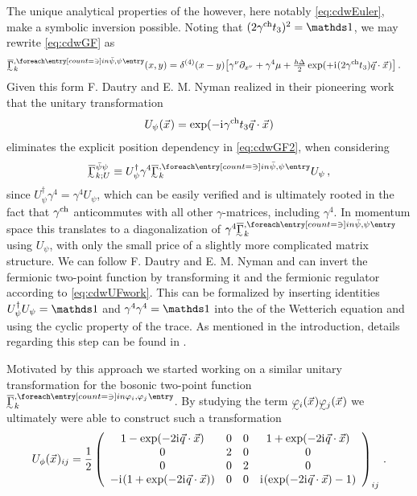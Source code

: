 The unique analytical properties of the \cdw{} however, here notably \cref{eq:cdwEuler}, make a symbolic inversion possible. Noting that $(2\gammach t_3)^2=\Id$, we may rewrite \cref{eq:cdwGF}
as
\begin{align}
\FSvertexArg{\FSeaaEoMI}{\MFpsib, \MFpsi}(x,y)&=\delta^{(4)}(x-y)\big[\gamma^\nu\partial_{x^\nu}+\gamma^4\mu +\tfrac{h \Delta}{2} \exp(+ \iu (2\gammach t_3) \vec{q}\cdot\vec{x}\vts) \big]\label{eq:cdwGF2}\, .
\end{align}
Given this form F. Dautry and E. M. Nyman realized in their pioneering work~\cite{Dautry:1979bk} that the unitary transformation
\begin{align}
U_\psi(\vec{x}\mskip1.0mu)= \exp(- \mathrm{i}\mkern1mu \gamma^{\mathrm{ch}} t_3 \vec{q}\cdot\vec{x}\mskip1.0mu)
\label{eq:cdwUf}
\end{align}
eliminates the explicit position dependency in \cref{eq:cdwGF2}, when considering
\begin{align}
\FSeaaEoMI_{k;U}^{\MFpsib\MFpsi}\equiv U_\psi^\dagger \gamma^4 \FSvertexArg{\FSeaaEoMI}{\MFpsib, \MFpsi} U_\psi\, ,\label{eq:cdwUFwork}
\end{align}
since $U_\psi^\dagger  \gamma^4 =  \gamma^4U_\psi$, which can be easily verified and is ultimately rooted in the fact that $\gamma^{\mathrm{ch}}$ anticommutes with all other $\gamma$-matrices, including $\gamma^4$. In momentum space this translates to a diagonalization of $\gamma^4 \FSvertexArg{\FSeaaEoMI}{\MFpsib, \MFpsi}$ using $U_\psi$, with only the small price of a slightly more complicated matrix structure. We can follow  F. Dautry and E. M. Nyman and can invert the fermionic two-point function by transforming it and the fermionic regulator according to \eqref{eq:cdwUFwork}.
This can be formalized by inserting identities $U_\psi^\dagger U_\psi=\Id$ and $\gamma^4\gamma^4=\Id$ into the \rhs{} of the Wetterich equation and using the cyclic property of the trace. As mentioned in the introduction, details regarding this step can be found in .

Motivated by this approach we started working on a similar unitary transformation for the bosonic two-point function $\FSvertexArg{\FSeaaEoMI}{\MFphi_i, \MFphi_j}$. 
By studying the term $\MFEIphi_i(\vec{x}\vts) \MFEIphi_j(\vec{x}\vts)$ we ultimately were able to construct such a transformation
\begin{align}
U_\phi(\vec{x}\mskip1.0mu)_{ij}=\frac{1}{2}\left(
\begin{array}{cccc}
	1 - \exp(-2\mathrm{i}\mkern1mu \vec q \cdot \vec x)& 0& 0& 1+\exp(-2\mathrm{i}\mkern1mu \vec q \cdot \vec x)\\
	0 & 2& 0&0\\
	0 & 0& 2&0\\
	-\mathrm{i}\mkern1mu(1+\exp(-2\mathrm{i}\mkern1mu \vec q \cdot \vec x)) & 0& 0& \mathrm{i}\mkern1mu(\exp(-2\mathrm{i}\mkern1mu \vec q \cdot \vec x)-1)\\
\end{array}
\right)_{ij}\,.
\label{eq:Uphi}
\end{align}

